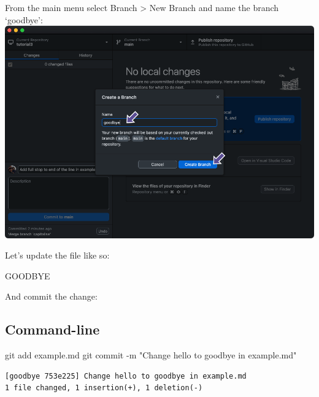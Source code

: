 \documentclass[
  letterpaper,
  DIV=11,
  numbers=noendperiod]{scrartcl}
\newenvironment{Shaded}{\begin{snugshade}}{\end{snugshade}}
\newcommand{\NormalTok}[1]{\textcolor[rgb]{0.00,0.23,0.31}{#1}}
\newcommand{\SpecialCharTok}[1]{\textcolor[rgb]{0.37,0.37,0.37}{#1}}
\newcommand{\StringTok}[1]{\textcolor[rgb]{0.13,0.47,0.30}{#1}}
\begin{document}
From the main menu select Branch \textgreater{} New Branch and name the
branch `goodbye': \includegraphics{images/image58.png}

Let's update the file like so:

\begin{tcolorbox}[enhanced jigsaw, toprule=.15mm, coltitle=black, opacitybacktitle=0.6, leftrule=.75mm, bottomrule=.15mm, colframe=quarto-callout-note-color-frame, titlerule=0mm, title=\textcolor{quarto-callout-note-color}{\faInfo}\hspace{0.5em}{example.md}, colback=white, breakable, opacityback=0, left=2mm, colbacktitle=quarto-callout-note-color!10!white, toptitle=1mm, bottomtitle=1mm, arc=.35mm, rightrule=.15mm]

GOODBYE

\end{tcolorbox}

And commit the change:

\subsection{Command-line}

\begin{Shaded}
\begin{Highlighting}[]
\NormalTok{git add example.md}
\NormalTok{git commit }\SpecialCharTok{{-}}\NormalTok{m }\StringTok{"Change hello to goodbye in example.md"}
\end{Highlighting}
\end{Shaded}

\begin{verbatim}
[goodbye 753e225] Change hello to goodbye in example.md
1 file changed, 1 insertion(+), 1 deletion(-)
\end{verbatim}
\end{document}
